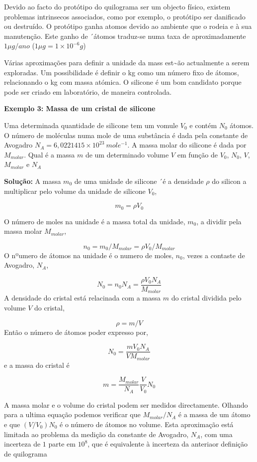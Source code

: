 \documentclass[
  portuguese,
  ]{book}
\begin{document}
Devido ao facto do protótipo do quilograma ser um objecto físico, existem problemas intrinsecos associados, como por exemplo, o protótipo ser danificado ou destruído. O protótipo ganha atomos devido ao ambiente que o rodeia e à sua manutenção. Este ganho de ´átomos traduz-se numa taxa de aproximadamente \(1\mu g/ano\) (\(1\mu g = 1\times10^{-6}g\))

Várias aproximações para definir a unidade da mass est\textasciitilde ão actualmente a serem exploradas. Um possibilidade é definir o kg como um número fixo de átomos, relacionando o kg com massa atómica. O silicone é um bom candidato porque pode ser criado em laboratório, de maneira controlada.

\textbf{Exemplo 3: Massa de um cristal de silicone}

Uma determinada quantidade de silicone tem um vomule \(V_0\) e contém \(N_0\) átomos. O número de moléculas numa mole de uma substância é dada pela constante de Avogadro \(N_A=6,0221415\times10^{23}\ mole^{-1}\). A massa molar do silicone é dada por \(M_{molar}\). Qual é a massa \(m\) de um determinado volume \(V\) em função de \(V_0\), \(N_0\), \(V\), \(M_{molar}\) e \(N_A\)

\textbf{Solução:} A massa \(m_0\) de uma unidade de silicone ´é a densidade \(\rho\) do silicon a multiplicar pelo volume da unidade de silicone \(V_0\),

\[m_0=\rho V_0\]

O número de moles na unidade é a massa total da unidade, \(m_0\), a dividir pela massa molar \(M_{molar}\),

\[n_0=m_0/M_{molar}=\rho V_0/M_{molar}\]
O nºumero de átomos na unidade é o numero de moles, \(n_0\), vezes a contaste de Avogadro, \(N_A\),

\[N_0=n_0N_A=\frac{\rho V_0 N_A}{M_{molar}}\]
A densidade do cristal está relacinada com a massa \(m\) do cristal dividida pelo volume \(V\) do cristal,

\[\rho=m/V\]
Então o número de átomos poder expresso por,

\[N_0=\frac{mV_0N_A}{VM_{molar}}\]
e a massa do cristal é

\[m=\frac{M_{molar}}{N_A}\frac{V}{V_0}N_0\]

A massa molar e o volume do cristal podem ser medidos directamente. Olhando para a ultima equação podemos verificar que \(M_{molar}/N_A\) é a massa de um átomo e que \((V/V_0)N_0\) é o número de átomos no volume. Esta aproximação está limitada ao problema da medição da constante de Avogadro, \(N_A\), com uma incerteza de \(1\) parte em \(10^8\), que é equivalente à incerteza da anteriaor definição de quilograma
\end{document}
